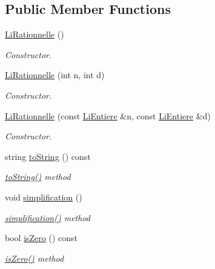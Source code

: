 \subsection*{Public Member Functions}
\begin{DoxyCompactItemize}
\item 
\hyperlink{class_li_rationnelle_ac88e880e6f08aebfb25e01d8aec740ba}{Li\+Rationnelle} ()
\begin{DoxyCompactList}\small\item\em Constructor. \end{DoxyCompactList}\item 
\hyperlink{class_li_rationnelle_aa8189c481d2f595c7c13ad8e0683cf3c}{Li\+Rationnelle} (int n, int d)
\begin{DoxyCompactList}\small\item\em Constructor. \end{DoxyCompactList}\item 
\hyperlink{class_li_rationnelle_a729eafaf83c01bd5a5d20c0d1cfd7d83}{Li\+Rationnelle} (const \hyperlink{class_li_entiere}{Li\+Entiere} \&n, const \hyperlink{class_li_entiere}{Li\+Entiere} \&d)
\begin{DoxyCompactList}\small\item\em Constructor. \end{DoxyCompactList}\item 
string \hyperlink{class_li_rationnelle_a2ef7aa4c19e3433794c251cc61296f58}{to\+String} () const 
\begin{DoxyCompactList}\small\item\em \hyperlink{class_li_rationnelle_a2ef7aa4c19e3433794c251cc61296f58}{to\+String()} method \end{DoxyCompactList}\item 
void \hyperlink{class_li_rationnelle_a1b96a094c77eb02f6b0728751a10648e}{simplification} ()
\begin{DoxyCompactList}\small\item\em \hyperlink{class_li_rationnelle_a1b96a094c77eb02f6b0728751a10648e}{simplification()} method \end{DoxyCompactList}\item 
bool \hyperlink{class_li_rationnelle_a3c9713b43958f09c4e2a7506fd9fdee8}{is\+Zero} () const 
\begin{DoxyCompactList}\small\item\em \hyperlink{class_li_rationnelle_a3c9713b43958f09c4e2a7506fd9fdee8}{is\+Zero()} method \end{DoxyCompactList}\item 

\end{DoxyCompactItemize}
